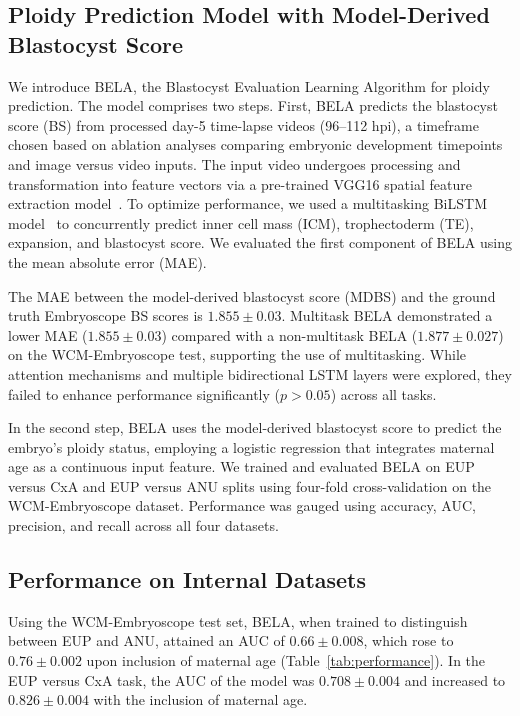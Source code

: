 \documentclass[12pt]{article}
\begin{document}
\subsection{Ploidy Prediction Model with Model-Derived Blastocyst Score}

We introduce BELA, the Blastocyst Evaluation Learning Algorithm for ploidy prediction. The model comprises two steps. First, BELA predicts the blastocyst score (BS) from processed day-5 time-lapse videos (96--112 hpi), a timeframe chosen based on ablation analyses comparing embryonic development timepoints and image versus video inputs. The input video undergoes processing and transformation into feature vectors via a pre-trained VGG16 spatial feature extraction model~\citep{simonyan2014vgg, deng2009imagenet}. To optimize performance, we used a multitasking BiLSTM model~\citep{schuster1997bilstm, hochreiter1997lstm} to concurrently predict inner cell mass (ICM), trophectoderm (TE), expansion, and blastocyst score. We evaluated the first component of BELA using the mean absolute error (MAE).

The MAE between the model-derived blastocyst score (MDBS) and the ground truth Embryoscope BS scores is $1.855 \pm 0.03$. Multitask BELA demonstrated a lower MAE ($1.855 \pm 0.03$) compared with a non-multitask BELA ($1.877 \pm 0.027$) on the WCM-Embryoscope test, supporting the use of multitasking. While attention mechanisms and multiple bidirectional LSTM layers were explored, they failed to enhance performance significantly ($p > 0.05$) across all tasks.

In the second step, BELA uses the model-derived blastocyst score to predict the embryo's ploidy status, employing a logistic regression that integrates maternal age as a continuous input feature. We trained and evaluated BELA on EUP versus CxA and EUP versus ANU splits using four-fold cross-validation on the WCM-Embryoscope dataset. Performance was gauged using accuracy, AUC, precision, and recall across all four datasets.

\subsection{Performance on Internal Datasets}

Using the WCM-Embryoscope test set, BELA, when trained to distinguish between EUP and ANU, attained an AUC of $0.66 \pm 0.008$, which rose to $0.76 \pm 0.002$ upon inclusion of maternal age (Table~\ref{tab:performance}). In the EUP versus CxA task, the AUC of the model was $0.708 \pm 0.004$ and increased to $0.826 \pm 0.004$ with the inclusion of maternal age.
\end{document}
